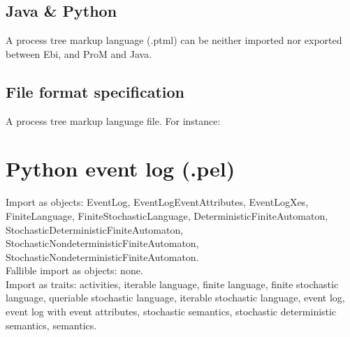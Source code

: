 {\subsection*{Java \& Python}
A process tree markup language (.ptml) can be neither imported nor exported between Ebi, and ProM and Java.
\subsection*{File format specification}A process tree markup language file.
For instance:
    
\clearpage
\section{Python event log (.pel)}
\label{filehandler:Python event log}
Import as objects: EventLog, EventLogEventAttributes, EventLogXes, FiniteLanguage, FiniteStochasticLanguage, DeterministicFiniteAutomaton, StochasticDeterministicFiniteAutomaton, StochasticNondeterministicFiniteAutomaton, StochasticNondeterministicFiniteAutomaton.
\\Fallible import as objects: none.
\\Import as traits: activities, iterable language, finite language, finite stochastic language, queriable stochastic language, iterable stochastic language, event log, event log with event attributes, stochastic semantics, stochastic deterministic semantics, semantics.
}
